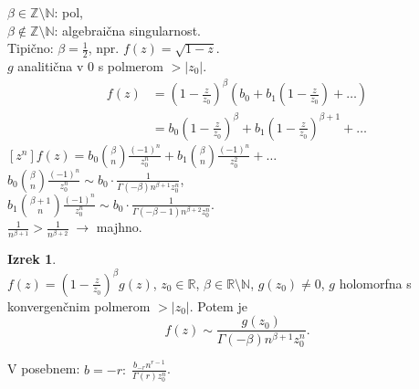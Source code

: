 \documentclass[a4paper, 12pt]{book}
\theoremstyle{definition}
\newtheorem{theorem}[counter]{Izrek}
\theoremstyle{remark}
\newcommand{\N}{\mathbb{N}}
\newcommand{\Z}{\mathbb{Z}}
\newcommand{\R}{\mathbb{R}}
\begin{document}
$\beta \in \Z \setminus \N$: pol, \\
$\beta \notin \Z \setminus \N$: algebraična singularnost. \\
Tipično: $\beta = \frac{1}{2}$, npr. $f(z) = \sqrt{1-z}$. \\
$g$ analitična v $0$ s polmerom $> |z_0|$. \\
\begin{align*}
  f(z) &= \left(1 - \frac{z}{z_0}\right)^{\beta}
    \left(b_0 + b_1 \left(1 - \frac{z}{z_0}\right) + \dots\right) \\
  &= b_0 \left(1 - \frac{z}{z_0}\right)^{\beta} + b_1 \left(1 - \frac{z}{z_0}\right)^{\beta+1} + \dots
\end{align*}
$[z^n] f(z) = b_0 \binom{\beta}{n} \frac{(-1)^n}{z_0^n} + b_1 \binom{\beta}{n} \frac{(-1)^n}{z_0^2} + \dots$ \\
$b_0 \binom{\beta}{n} \frac{(-1)^n}{z_0^n} \sim b_0 \cdot \frac{1}{\Gamma(-\beta) n^{\beta+1} z_0^n}$, \\
$b_1 \binom{\beta+1}{n} \frac{(-1)^n}{z_0^n} \sim b_0 \cdot \frac{1}{\Gamma(-\beta-1) n^{\beta+2} z_0^n}$. \\
$\frac{1}{n^{\beta+1}} > \frac{1}{n^{\beta+2}} \; \to$ majhno.
\begin{theorem} \text{} \\
  $f(z) = \left(1 - \frac{z}{z_0}\right)^{\beta} g(z)$, $z_0 \in \R$, $\beta \in \R \setminus \N$,
  $g(z_0) \neq 0$, $g$ holomorfna s konvergenčnim polmerom $> |z_0|$.
  Potem je
  \begin{equation*}
    [z^n] f(z) \sim \frac{g(z_0)}{\Gamma(-\beta) n^{\beta+1} z_0^n}.
  \end{equation*}
\end{theorem}
V posebnem: $b = -r: \; \frac{b_{-r} n^{r-1}}{\Gamma(r) z_0^n}$.
\end{document}
